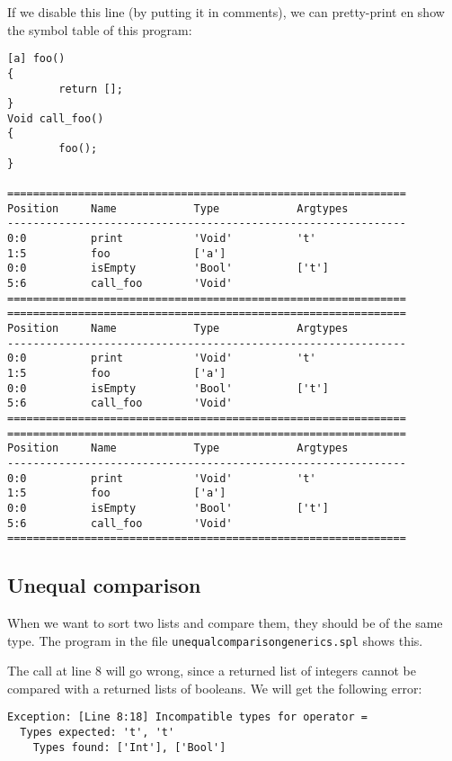 \documentclass[a4paper]{article}
\begin{document}
If we disable this line (by putting it in comments), we can pretty-print en show the symbol table of this program:
\begin{verbatim}
[a] foo()
{
        return [];
}
Void call_foo()
{
        foo();
}

==============================================================
Position     Name            Type            Argtypes            
--------------------------------------------------------------
0:0          print           'Void'          't'                 
1:5          foo             ['a']                               
0:0          isEmpty         'Bool'          ['t']               
5:6          call_foo        'Void'                              
==============================================================
==============================================================
Position     Name            Type            Argtypes            
--------------------------------------------------------------
0:0          print           'Void'          't'                 
1:5          foo             ['a']                               
0:0          isEmpty         'Bool'          ['t']               
5:6          call_foo        'Void'                              
==============================================================
==============================================================
Position     Name            Type            Argtypes            
--------------------------------------------------------------
0:0          print           'Void'          't'                 
1:5          foo             ['a']                               
0:0          isEmpty         'Bool'          ['t']               
5:6          call_foo        'Void'                              
==============================================================
\end{verbatim}

\subsection{Unequal comparison}
When we want to sort two lists and compare them, they should be of the same type. The program in the file {\tt unequalcomparisongenerics.spl} shows this. 

The call at line 8 will go wrong, since a returned list of integers cannot be compared with a returned lists of booleans. We will get the following error: 
\begin{verbatim}
Exception: [Line 8:18] Incompatible types for operator = 
  Types expected: 't', 't'
    Types found: ['Int'], ['Bool']
\end{verbatim}
\end{document}
